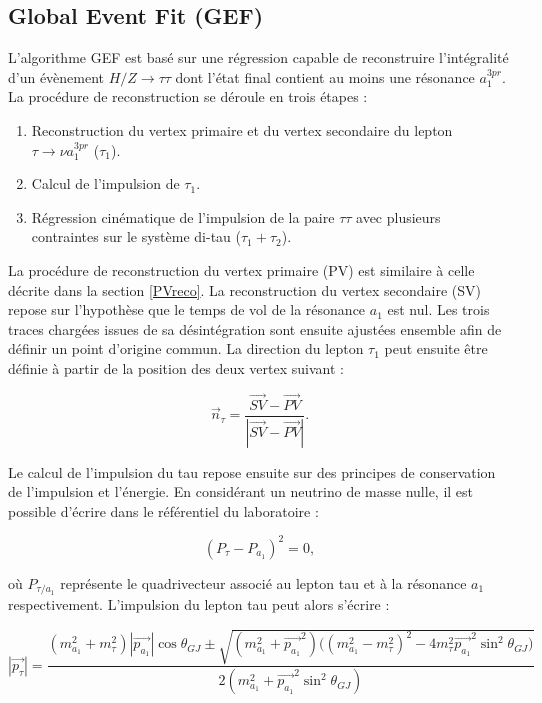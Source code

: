 \subsection{Global Event Fit (GEF)}
\label{GEF}

L'algorithme GEF \cite{GEF} est basé sur une régression capable de reconstruire l'intégralité d'un évènement $H/Z\rightarrow\tau\tau$ dont l'état final contient au moins une résonance $a_1^{3pr}$. La procédure de reconstruction se déroule en trois étapes :

\begin{enumerate}
    \item Reconstruction du vertex primaire et du vertex secondaire du lepton $\tau\rightarrow\nu a_1^{3pr}$ ($\tau_1$).
    \item Calcul de l'impulsion de $\tau_1$.
    \item Régression cinématique de l'impulsion de la paire $\tau\tau$ avec plusieurs contraintes sur le système di-tau ($\tau_1+\tau_2$). 
\end{enumerate}

La procédure de reconstruction du vertex primaire (PV) est similaire à celle décrite dans la section \ref{PVreco}. La reconstruction du vertex secondaire (SV) repose sur l'hypothèse que le temps de vol de la résonance $a_1$ est nul. Les trois traces chargées issues de sa désintégration sont ensuite ajustées ensemble afin de définir un point d'origine commun. La direction du lepton $\tau_1$ peut ensuite être définie à partir de la position des deux vertex suivant :

\begin{equation}
    \vec{n}_{\tau}=\frac{\overrightarrow{SV}-\overrightarrow{PV}}{|\overrightarrow{SV}-\overrightarrow{PV}|}.
\end{equation}

Le calcul de l'impulsion du tau repose ensuite sur des principes de conservation de l'impulsion et l'énergie. En considérant un neutrino de masse nulle, il est possible d'écrire dans le référentiel du laboratoire :

\begin{equation}
    (P_{\tau}-P_{a_1})^2=0,
\end{equation}

où $P_{\tau/a_1}$ représente le quadrivecteur associé au lepton tau et à la résonance $a_1$ respectivement. L'impulsion du lepton tau peut alors s'écrire :

\begin{equation}
    |\vec{p_{\tau}}|=\frac{(m_{a_1}^2+m_{\tau}^2)|\vec{p_{a_1}}|\cos\theta_{GJ}\pm\sqrt{(m_{a_1}^2+\vec{p_{a_1}}^2)\bigl((m_{a_1}^2-m_{\tau}^2)^2-4m_{\tau}^2\vec{p_{a_1}}^2\sin^2\theta_{GJ}\bigr)}}{2(m_{a_1}^2+\vec{p_{a_1}}^2\sin^2\theta_{GJ})}
    \label{taup}
\end{equation}

